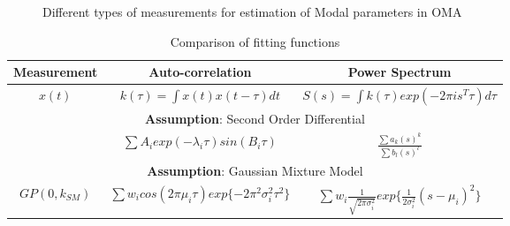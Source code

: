 \begin{figure}[!ht]
  \centering
  \quad
  \quad
  
  \caption{Different types of measurements for estimation of Modal parameters in OMA}
\end{figure}

\renewcommand{\arraystretch}{1.2}
\begin{table}[!ht]
    \centering
\begin{tabularx}{\textwidth}{c|c|c}
  \hline
  \textbf{Measurement} & \textbf{Auto-correlation} & \textbf{Power Spectrum} \\
  \hline
  $x(t)$ & $k(\tau) = \int x(t)x(t-\tau)dt$ &  $S(s) = \int k(\tau)exp(-2 \pi i s^{T} \tau )d\tau$\\
  \hline \hline
  \multicolumn{3}{|c|}{\textbf{Assumption}: Second Order Differential}\\
  \hline
   & $ \sum A_{i}exp(-\lambda_{i}\tau)sin(B_{i}\tau)$ & $\frac{\sum a_{k}(s)^{k}}{\sum b_{l}(s)^{l}}$\\
   \hline \hline
   \multicolumn{3}{|c|}{\textbf{Assumption}: Gaussian Mixture Model}\\
   \hline
   $GP(0 , k_{SM})$ 
   & $  \sum w_{i} cos(2\pi\mu_{i}\tau) exp\{-2\pi^{2}\sigma_{i}^{2}\tau^{2}\}$ 
   & $ \sum w_{i}  \frac{1}{\sqrt{2\pi\sigma_{i}^{2}}}exp\{\frac{1}{2\sigma_{i}^{2}}(s-\mu_{i})^{2}\} $\\
   \hline
\end{tabularx}
\caption{Comparison of fitting functions}
  \label{tab:comparisonOfFittingFunctions}
\end{table}

